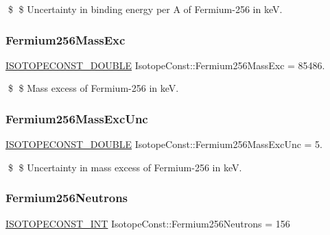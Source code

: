 \$ \$ Uncertainty in binding energy per A of Fermium-\/256 in keV. \mbox{\label{group___isotope_const-_fermium-_fm256_ga684ff1d765904604890a0a0fe3210596}} 
\subsubsection{\texorpdfstring{Fermium256\+Mass\+Exc}{Fermium256MassExc}}
{\footnotesize\ttfamily \mbox{\hyperlink{group___isotope_const-_macros_ga8f45a7272ce02c0b4c65c44636ed719a}{I\+S\+O\+T\+O\+P\+E\+C\+O\+N\+S\+T\+\_\+\+D\+O\+U\+B\+LE}} Isotope\+Const\+::\+Fermium256\+Mass\+Exc = 85486.}

\$ \$ Mass excess of Fermium-\/256 in keV. \mbox{\label{group___isotope_const-_fermium-_fm256_gac9c708c8accca4d6a69032b187aa289b}} 
\subsubsection{\texorpdfstring{Fermium256\+Mass\+Exc\+Unc}{Fermium256MassExcUnc}}
{\footnotesize\ttfamily \mbox{\hyperlink{group___isotope_const-_macros_ga8f45a7272ce02c0b4c65c44636ed719a}{I\+S\+O\+T\+O\+P\+E\+C\+O\+N\+S\+T\+\_\+\+D\+O\+U\+B\+LE}} Isotope\+Const\+::\+Fermium256\+Mass\+Exc\+Unc = 5.}

\$ \$ Uncertainty in mass excess of Fermium-\/256 in keV. \mbox{\label{group___isotope_const-_fermium-_fm256_ga2a23e78b472ed39eaa4a37fa39e96b6b}} 
\subsubsection{\texorpdfstring{Fermium256\+Neutrons}{Fermium256Neutrons}}
{\footnotesize\ttfamily \mbox{\hyperlink{group___isotope_const-_macros_ga5f18360b3e99483a35c32d789e62621c}{I\+S\+O\+T\+O\+P\+E\+C\+O\+N\+S\+T\+\_\+\+I\+NT}} Isotope\+Const\+::\+Fermium256\+Neutrons = 156}

